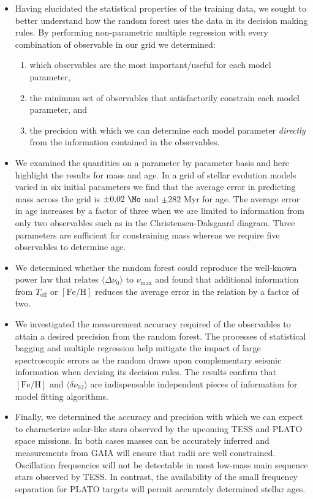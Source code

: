 \begin{itemize}
  
  \item Having elucidated the statistical properties of the training data, we sought to better understand how the random forest uses the data in its decision making rules.
By performing non-parametric multiple regression with every combination of observable in our grid we determined:
\begin{enumerate}
    \item  which observables are the most important/useful for each model parameter,
    \item  the minimum set of observables that satisfactorily constrain each model parameter, and
    \item  the precision with which we can determine each model parameter \emph{directly} from the information contained in the observables. 
\end{enumerate}



\item We examined the quantities on a parameter by parameter basis and here highlight the results for mass and age.  In a grid of stellar evolution models varied in six initial parameters we find that the average error in predicting mass across the grid is ${\pm 0.02 \ \Mo}$ and  ${\pm 282}$ Myr for age. The average error in age increases by a factor of three when we are limited to information from only two observables such as in the Christensen-Dalsgaard diagram. Three parameters are sufficient for constraining mass whereas we require five observables to determine age.  


\item We determined whether the random forest could reproduce the well-known power law that relates ${\langle\Delta\nu_0\rangle}$ to $\nu_{\max}$ and found that additional information from  $T_{\text{eff}}$ or  $[\text{Fe/H}]$ reduces the average error in the relation by a factor of two. 

\item We investigated the measurement accuracy required of the observables to attain a desired precision from the random forest. 
The processes of statistical bagging and multiple regression help mitigate the impact of large spectroscopic errors as the random draws upon complementary seismic information when devising its decision rules. 
The results confirm that $[\text{Fe/H}]$  and  ${\langle\delta\nu_{02}\rangle}$ are indispensable independent pieces of information for model fitting algorithms.

\item Finally, we determined the accuracy and precision with which we can expect to characterize solar-like stars observed by the upcoming TESS and PLATO space missions. In both cases masses can be accurately inferred and measurements from GAIA will ensure that radii are well constrained. Oscillation frequencies will not be detectable in most low-mass main sequence stars observed by TESS. In contrast, the availability of the small frequency separation for PLATO targets will permit accurately determined stellar ages. 
\end{itemize}





